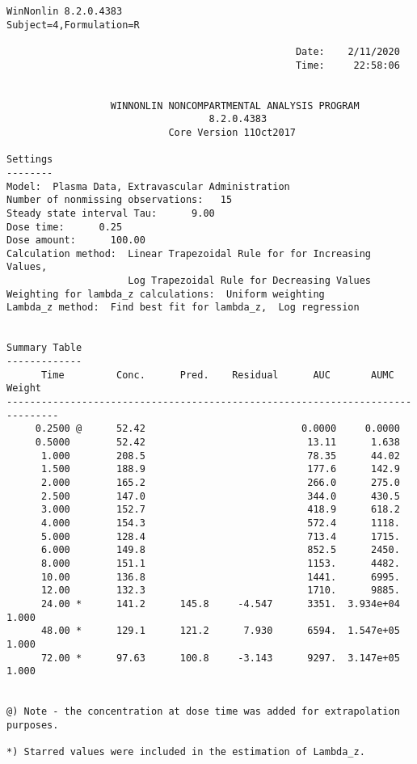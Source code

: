 \documentclass[12pt,a4paper]{article}
\begin{document}
\begin{verbatim}
WinNonlin 8.2.0.4383
Subject=4,Formulation=R

                                                  Date:    2/11/2020
                                                  Time:     22:58:06


                  WINNONLIN NONCOMPARTMENTAL ANALYSIS PROGRAM
                                   8.2.0.4383
                            Core Version 11Oct2017

Settings
--------
Model:  Plasma Data, Extravascular Administration
Number of nonmissing observations:   15
Steady state interval Tau:      9.00
Dose time:      0.25
Dose amount:      100.00
Calculation method:  Linear Trapezoidal Rule for for Increasing Values,
                     Log Trapezoidal Rule for Decreasing Values
Weighting for lambda_z calculations:  Uniform weighting
Lambda_z method:  Find best fit for lambda_z,  Log regression


Summary Table
-------------
      Time         Conc.      Pred.    Residual      AUC       AUMC      Weight
-------------------------------------------------------------------------------
     0.2500 @      52.42                           0.0000     0.0000
     0.5000        52.42                            13.11      1.638
      1.000        208.5                            78.35      44.02
      1.500        188.9                            177.6      142.9
      2.000        165.2                            266.0      275.0
      2.500        147.0                            344.0      430.5
      3.000        152.7                            418.9      618.2
      4.000        154.3                            572.4      1118.
      5.000        128.4                            713.4      1715.
      6.000        149.8                            852.5      2450.
      8.000        151.1                            1153.      4482.
      10.00        136.8                            1441.      6995.
      12.00        132.3                            1710.      9885.
      24.00 *      141.2      145.8     -4.547      3351.  3.934e+04      1.000
      48.00 *      129.1      121.2      7.930      6594.  1.547e+05      1.000
      72.00 *      97.63      100.8     -3.143      9297.  3.147e+05      1.000


@) Note - the concentration at dose time was added for extrapolation purposes.

*) Starred values were included in the estimation of Lambda_z.



\end{verbatim}
\end{document}
